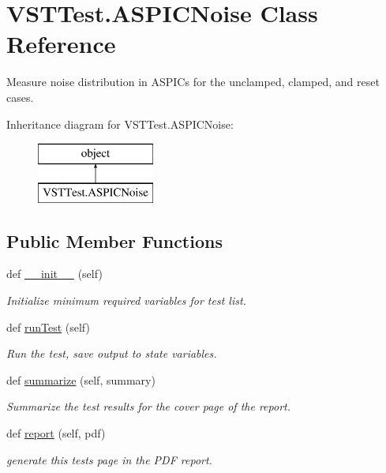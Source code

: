 \hypertarget{class_v_s_t_test_1_1_a_s_p_i_c_noise}{}\section{V\+S\+T\+Test.\+A\+S\+P\+I\+C\+Noise Class Reference}
\label{class_v_s_t_test_1_1_a_s_p_i_c_noise}


Measure noise distribution in A\+S\+P\+I\+Cs for the unclamped, clamped, and reset cases.  


Inheritance diagram for V\+S\+T\+Test.\+A\+S\+P\+I\+C\+Noise\+:\begin{figure}[H]
\begin{center}
\leavevmode
\includegraphics[height=2.000000cm]{class_v_s_t_test_1_1_a_s_p_i_c_noise}
\end{center}
\end{figure}
\subsection*{Public Member Functions}
\begin{DoxyCompactItemize}
\item 
def \hyperlink{class_v_s_t_test_1_1_a_s_p_i_c_noise_adbdd35857b4e3814cb46e18099835b13}{\+\_\+\+\_\+init\+\_\+\+\_\+} (self)
\begin{DoxyCompactList}\small\item\em Initialize minimum required variables for test list. \end{DoxyCompactList}\item 
def \hyperlink{class_v_s_t_test_1_1_a_s_p_i_c_noise_a6111fa01f3ab4e5108594ef967dd304a}{run\+Test} (self)
\begin{DoxyCompactList}\small\item\em Run the test, save output to state variables. \end{DoxyCompactList}\item 
def \hyperlink{class_v_s_t_test_1_1_a_s_p_i_c_noise_a17fb047a564da4c19572f8e3e3942687}{summarize} (self, summary)
\begin{DoxyCompactList}\small\item\em Summarize the test results for the cover page of the report. \end{DoxyCompactList}\item 
def \hyperlink{class_v_s_t_test_1_1_a_s_p_i_c_noise_a8c19116ee5a9c085973a299ec4cd3406}{report} (self, pdf)
\begin{DoxyCompactList}\small\item\em generate this test\textquotesingle{}s page in the P\+DF report. \end{DoxyCompactList}\end{DoxyCompactItemize}


